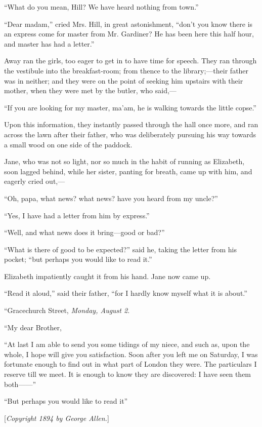 \documentclass[12pt,openright]{book}
\begin{document}
“What do you mean, Hill? We have heard nothing from town.”

“Dear madam,” cried Mrs. Hill, in great astonishment, “don’t you know there is an express come for master from Mr. Gardiner? He has been here this half hour, and master has had a letter.”

Away ran the girls, too eager to get in to have time for speech. They ran through the vestibule into the breakfast-room; from thence to the library;—their father was in neither; and they were on the point of seeking him upstairs with their mother, when they were met by the butler, who said,—

“If you are looking for my master, ma’am, he is walking towards the little copse.”

Upon this information, they instantly passed through the hall once more, and ran across the lawn after their father, who was deliberately pursuing his way towards a small wood on one side of the paddock.

Jane, who was not so light, nor so much in the habit of running as Elizabeth, soon lagged behind, while her sister, panting for breath, came up with him, and eagerly cried out,—

“Oh, papa, what news? what news? have you heard from my uncle?”

“Yes, I have had a letter from him by express.”

“Well, and what news does it bring—good or bad?”

“What is there of good to be expected?” said he, taking the letter from his pocket; “but perhaps you would like to read it.”

Elizabeth impatiently caught it from his hand. Jane now came up.

“Read it aloud,” said their father, “for I hardly know myself what it is about.”

“Gracechurch Street, \textit{Monday, August 2}.

“My dear Brother,


“At last I am able to send you some tidings of my niece, and such as, upon the whole, I hope will give you satisfaction. Soon after you left me on Saturday, I was fortunate enough to find out in what part of London they were. The particulars I reserve till we meet. It is enough to know they are discovered: I have seen them both——”

“But perhaps you would like to read it”


[\textit{Copyright 1894 by George Allen.}]
\end{document}
